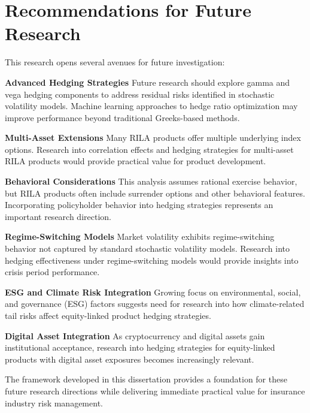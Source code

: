\documentclass[12pt,a4paper]{report}
\begin{document}
\section{Recommendations for Future Research}

This research opens several avenues for future investigation:

\textbf{Advanced Hedging Strategies}
Future research should explore gamma and vega hedging components to address residual risks identified in stochastic volatility models. Machine learning approaches to hedge ratio optimization may improve performance beyond traditional Greeks-based methods.

\textbf{Multi-Asset Extensions}
Many RILA products offer multiple underlying index options. Research into correlation effects and hedging strategies for multi-asset RILA products would provide practical value for product development.

\textbf{Behavioral Considerations}
This analysis assumes rational exercise behavior, but RILA products often include surrender options and other behavioral features. Incorporating policyholder behavior into hedging strategies represents an important research direction.

\textbf{Regime-Switching Models}
Market volatility exhibits regime-switching behavior not captured by standard stochastic volatility models. Research into hedging effectiveness under regime-switching models would provide insights into crisis period performance.

\textbf{ESG and Climate Risk Integration}
Growing focus on environmental, social, and governance (ESG) factors suggests need for research into how climate-related tail risks affect equity-linked product hedging strategies.

\textbf{Digital Asset Integration}
As cryptocurrency and digital assets gain institutional acceptance, research into hedging strategies for equity-linked products with digital asset exposures becomes increasingly relevant.

The framework developed in this dissertation provides a foundation for these future research directions while delivering immediate practical value for insurance industry risk management.

% 
% 
\end{document}
